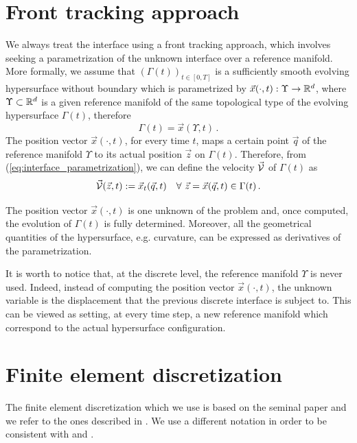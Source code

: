 \section{Front tracking approach}\label{sec:front_tracking_approach}
We always treat the interface using a front tracking approach, which involves
seeking a parametrization of the unknown interface over a reference manifold.
More formally, we assume that $(\Gamma(t))_{t\in [0,T]}$ is a sufficiently
smooth evolving hypersurface without boundary which is parametrized by
$\vec x(\cdot,t):\Upsilon\to{\mathbb R}^d$, where $\Upsilon\subset {\mathbb R}^d$ is a given
reference manifold of the same topological type of the evolving hypersurface
$\Gamma(t)$, therefore
\begin{equation}\label{eq:interface_parametrization}
\Gamma(t) = \vec x(\Upsilon,t)\,.
\end{equation}
The position vector $\vec x(\cdot,t)$, for every time $t$, maps a certain point
$\vec q$ of the reference manifold $\Upsilon$ to its actual position
$\vec z$ on $\Gamma(t)$. Therefore, from (\ref{eq:interface_parametrization}),
we can define the velocity $\vec{\mathcal{V}}$ of $\Gamma(t)$ as
\begin{equation} \label{eq:V}
\vec{\mathcal{V}}(\vec z, t) := \vec x_t(\vec q, t) \quad
\forall\ \vec z = \vec x(\vec q,t) \in \Gamma(t)\,.
\end{equation}

The position vector $\vec x(\cdot,t)$ is one unknown of the problem and, once
computed, the evolution of $\Gamma(t)$ is fully determined. Moreover, all the
geometrical quantities of the hypersurface, e.g. curvature, can be expressed as
derivatives of the parametrization.

It is worth to notice that, at the discrete level, the reference manifold
$\Upsilon$ is never used. Indeed, instead of computing the position vector
$\vec x(\cdot,t)$, the unknown variable is the displacement that the previous
discrete interface is subject to. This can be viewed as setting, at every time
step, a new reference manifold which correspond to the actual hypersurface
configuration.

\section{Finite element discretization}\label{sec:geometric_pdes_fem}
The finite element discretization which we use is based on the seminal paper
\cite{Dziuk91} and we refer to the ones described in
\cite{triplejMC,triplej,gflows3d}. We use a different notation in order to be
consistent with \cite{spurious} and \cite{stokesfitted}.


